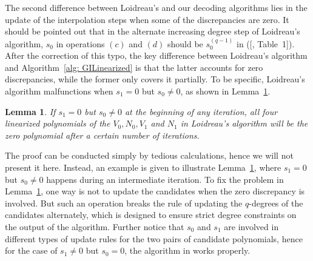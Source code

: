 \documentclass[11pt,onecolumn,draftcls]{IEEEtran}
\newtheorem{lemma}{Lemma}
\begin{document}
The second difference between Loidreau's and our decoding algorithms lies in the update of the interpolation steps when some of the discrepancies are zero. It should be pointed out that in the alternate increasing degree step of Loidreau's algorithm, $s_0$ in operations $(c)$ and $(d)$ should be $s_0^{(q-1)}$
in\makeatletter
    \renewcommand\@cite [1]{#1}
    \makeatother ([\cite{loidreau_wcc05}, Table~1]).\makeatletter
    \renewcommand\@cite [1] {[#1]}
    \makeatother
After the correction of this typo, the key difference between Loidreau's algorithm and Algorithm~\ref{alg: GILinearized} is that the latter accounts for zero discrepancies, while the former only covers it partially. To be specific, Loidreau's algorithm\makeatletter
    \renewcommand\@cite [1]{#1}
    \makeatletter
    \renewcommand\@cite [1] {[#1]}
    \makeatother
malfunctions when $s_1 = 0$ but $s_0 \ne 0$, as shown in Lemma~\ref{lemma: Ldzero}.
\begin{lemma} \label{lemma: Ldzero}
If $s_1 = 0$ but $s_0 \ne 0$ at the beginning of any iteration, all four linearized polynomials of the $V_0, N_0, V_1$ and $N_1$ in Loidreau's algorithm will be the zero polynomial after a certain number of iterations.
\end{lemma}
The proof can be conducted simply by tedious calculations, hence we will not present it here. Instead, an example is given to illustrate Lemma~\ref{lemma: Ldzero}, where $s_1 = 0$ but $s_0 \ne 0$ happens during an intermediate iteration. To fix the problem in Lemma~\ref{lemma: Ldzero}, one way is not to update the candidates when the zero discrepancy is involved. But such an operation breaks the rule of updating the $q$-degrees of the candidates alternately, which is designed to ensure strict degree constraints on the output of the algorithm. Further notice that $s_0$ and $s_1$ are involved in different types of update rules for the two pairs of candidate polynomials, hence for the case of $s_1 \ne 0$ but $s_0 = 0$, the algorithm in\makeatletter
    \renewcommand\@cite [1]{#1}
    \makeatletter
    \renewcommand\@cite [1] {[#1]}
    \makeatother works properly.
\end{document}
